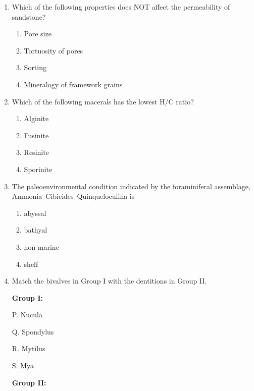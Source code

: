 \documentclass[journal,12pt,onecolumn]{IEEEtran}
\theoremstyle{remark}
\begin{document}
\begin{enumerate}[resume]
\item Which of the following properties does NOT affect the permeability of sandstone?
\begin{multicols}{2}
\begin{enumerate}
\item Pore size
\item Tortuosity of pores
\item Sorting
\item Mineralogy of framework grains
\end{enumerate}
\end{multicols}
\vspace{0.5cm}

\item Which of the following macerals has the lowest H/C ratio?
\begin{multicols}{4}
\begin{enumerate}
\item Alginite
\item Fusinite
\item Resinite
\item Sporinite
\end{enumerate}
\end{multicols}
\vspace{0.5cm}

\item The paleoenvironmental condition indicated by the foraminiferal assemblage, Ammonia--Cibicides--Quinqueloculina is
\begin{multicols}{4}
\begin{enumerate}
\item abyssal
\item bathyal
\item non-marine
\item shelf
\end{enumerate}
\end{multicols}
\vspace{0.5cm}
\item Match the bivalves in Group I with the dentitions in Group II.

\noindent
\begin{minipage}[t]{0.45\textwidth}
\textbf{Group I:}  

P. Nucula  

Q. Spondylus  

R. Mytilus  

S. Mya  
\end{minipage}
\hfill
\begin{minipage}[t]{0.45\textwidth}
\textbf{Group II:}  


\end{minipage}
\end{enumerate}
\end{document}
